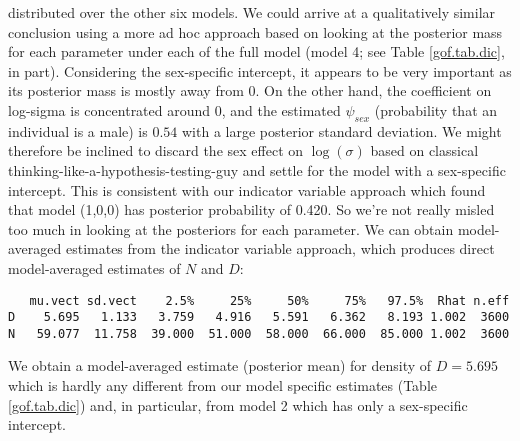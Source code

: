 distributed over the other six models. We could arrive at a
qualitatively similar conclusion using a more ad hoc approach based
on looking at the posterior mass for each parameter under each of the
full model (model 4; see Table \ref{gof.tab.dic}, in part). Considering
the sex-specific intercept, it appears to be very important as its
posterior mass is mostly away from 0.  On the other hand, the
coefficient on log-sigma is concentrated around 0, and the estimated
$\psi_{sex}$ (probability that an individual is a male) is $0.54$ with
a large posterior standard deviation.  We might therefore be inclined
to discard the sex effect on $\log(\sigma)$ based on classical
thinking-like-a-hypothesis-testing-guy and settle for the model with a
sex-specific intercept. This is consistent with our indicator variable
approach which found that model (1,0,0) has posterior probability of
0.420. So we're not really misled too much in looking at the
posteriors for each parameter.  We can obtain model-averaged estimates
from the indicator variable approach, which produces direct
model-averaged estimates of $N$ and $D$:
{\small
\begin{verbatim}
   mu.vect sd.vect    2.5%     25%     50%     75%   97.5%  Rhat n.eff
D    5.695   1.133   3.759   4.916   5.591   6.362   8.193 1.002  3600
N   59.077  11.758  39.000  51.000  58.000  66.000  85.000 1.002  3600
\end{verbatim}
}
We obtain a model-averaged estimate (posterior mean) for density of $D=5.695$
which is hardly any different from our
model specific estimates (Table \ref{gof.tab.dic}) and, in particular, from model 2
which has only a sex-specific intercept.



\begin{comment}
XXXX MIGHT BE GOOD TO HAVE THIS BUT OPTIONAL XXXXXXXXXXX
\subsection{Sensitivity to Prior Distributions}

{\bf XXXXXXXXXXX TO BE DONE XXXXXXXXXX}

Discussion of sensitivity to prior ......
Results of DIC and model indicator variable analyses were based on
unif(-3,3) priors for the parameters. This keeps them in the ballpark
when they are not in the model. We tried a different prior:
normal(0,.1) which you can do just by editing the function
 \mbox{\tt wolvSCR0ms}.
Doing the DIC analysis changes the result to XXXXXXXXXXXXX

The indicator variable analysis was rerun and that produces XXXXXXXXXXXXXXX
We modified
 the {\bf R} script to run the same model
but with \mbox{\tt dnorm(0,.1)} prior distributions, producing the
following results:  {\bf XXXXX RERUN THIS XXXXXXX}
\begin{verbatim}
> mod <- toad5$BUGSoutput$sims.list$mod
> mod <- paste(mod[,1],mod[,2])
> table(mod)/length(mod)

mod
       0 0        0 1        1 0        1 1
0.43945000 0.02185000 0.50708333 0.03161667
\end{verbatim}
\end{comment}


